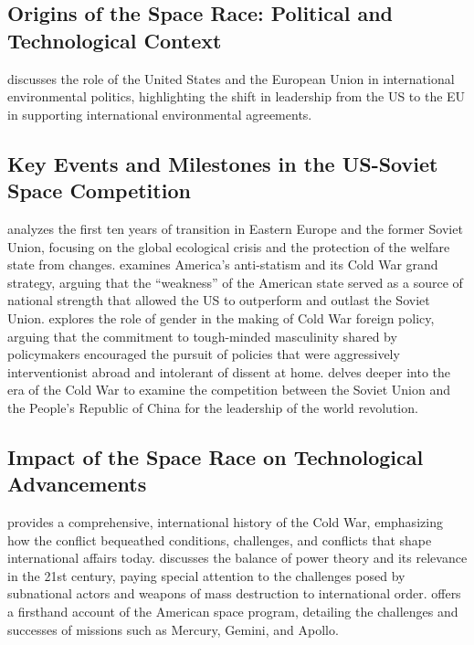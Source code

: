 \documentclass{article}
\begin{document}
\subsection{Origins of the Space Race: Political and Technological Context}

\cite{Kelemen2010TradingPT} discusses the role of the United States and the European Union in international environmental politics, highlighting the shift in leadership from the US to the EU in supporting international environmental agreements.

\subsection{Key Events and Milestones in the US-Soviet Space Competition}

\cite{Carman2002TransitionTF} analyzes the first ten years of transition in Eastern Europe and the former Soviet Union, focusing on the global ecological crisis and the protection of the welfare state from changes. \cite{Friedberg2000InTS} examines America's anti-statism and its Cold War grand strategy, arguing that the ``weakness'' of the American state served as a source of national strength that allowed the US to outperform and outlast the Soviet Union. \cite{Dean2001ImperialBG} explores the role of gender in the making of Cold War foreign policy, arguing that the commitment to tough-minded masculinity shared by policymakers encouraged the pursuit of policies that were aggressively interventionist abroad and intolerant of dissent at home. \cite{Friedman2015ShadowCW} delves deeper into the era of the Cold War to examine the competition between the Soviet Union and the People's Republic of China for the leadership of the world revolution.

\subsection{Impact of the Space Race on Technological Advancements}

\cite{Leffler2010TheCH} provides a comprehensive, international history of the Cold War, emphasizing how the conflict bequeathed conditions, challenges, and conflicts that shape international affairs today. \cite{Maclean2004BalanceOP} discusses the balance of power theory and its relevance in the 21st century, paying special attention to the challenges posed by subnational actors and weapons of mass destruction to international order. \cite{Kranz2000FailureIN} offers a firsthand account of the American space program, detailing the challenges and successes of missions such as Mercury, Gemini, and Apollo.
\end{document}
